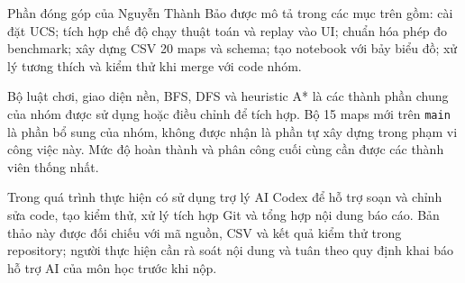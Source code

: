 Phần đóng góp của Nguyễn Thành Bảo được mô tả trong các mục trên gồm:
cài đặt UCS; tích hợp chế độ chạy thuật toán và replay vào UI; chuẩn
hóa phép đo benchmark; xây dựng CSV 20 maps và schema; tạo notebook
với bảy biểu đồ; xử lý tương thích và kiểm thử khi merge với code nhóm.

Bộ luật chơi, giao diện nền, BFS, DFS và heuristic A* là các thành
phần chung của nhóm được sử dụng hoặc điều chỉnh để tích hợp. Bộ 15
maps mới trên \texttt{main} là phần bổ sung của nhóm, không được nhận
là phần tự xây dựng trong phạm vi công việc này. Mức độ hoàn thành
và phân công cuối cùng cần được các thành viên thống nhất.

Trong quá trình thực hiện có sử dụng trợ lý AI Codex để hỗ trợ soạn
và chỉnh sửa code, tạo kiểm thử, xử lý tích hợp Git và tổng hợp nội
dung báo cáo. Bản thảo này được đối chiếu với mã nguồn, CSV và kết
quả kiểm thử trong repository; người thực hiện cần rà soát nội dung
và tuân theo quy định khai báo hỗ trợ AI của môn học trước khi nộp.
